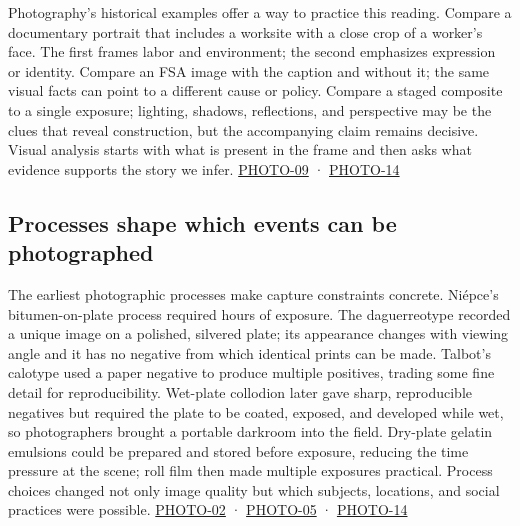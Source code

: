 Photography's historical examples offer a way to practice this reading. Compare a documentary portrait that includes a worksite with a close crop of a worker's face. The first frames labor and environment; the second emphasizes expression or identity. Compare an FSA image with the caption and without it; the same visual facts can point to a different cause or policy. Compare a staged composite to a single exposure; lighting, shadows, reflections, and perspective may be the clues that reveal construction, but the accompanying claim remains decisive. Visual analysis starts with what is present in the frame and then asks what evidence supports the story we infer. \hyperref[04-visual-computing-ii-ch036-photo-09---photography-session-09]{PHOTO-09} · \hyperref[04-visual-computing-ii-ch036-photo-14---photography-session-14]{PHOTO-14}

\subsection{Processes shape which events can be photographed}\label{04-visual-computing-ii-ch034-processes-shape-which-events-can-be-photographed}

\hypertarget{04-visual-computing-ii-ch034-processes-shape-which-events-can-be-photographed}{}

The earliest photographic processes make capture constraints concrete. Niépce's bitumen-on-plate process required hours of exposure. The daguerreotype recorded a unique image on a polished, silvered plate; its appearance changes with viewing angle and it has no negative from which identical prints can be made. Talbot's calotype used a paper negative to produce multiple positives, trading some fine detail for reproducibility. Wet-plate collodion later gave sharp, reproducible negatives but required the plate to be coated, exposed, and developed while wet, so photographers brought a portable darkroom into the field. Dry-plate gelatin emulsions could be prepared and stored before exposure, reducing the time pressure at the scene; roll film then made multiple exposures practical. Process choices changed not only image quality but which subjects, locations, and social practices were possible. \hyperref[04-visual-computing-ii-ch036-photo-02---photography-session-02]{PHOTO-02} · \hyperref[04-visual-computing-ii-ch036-photo-05---photography-session-05]{PHOTO-05} · \hyperref[04-visual-computing-ii-ch036-photo-14---photography-session-14]{PHOTO-14}

